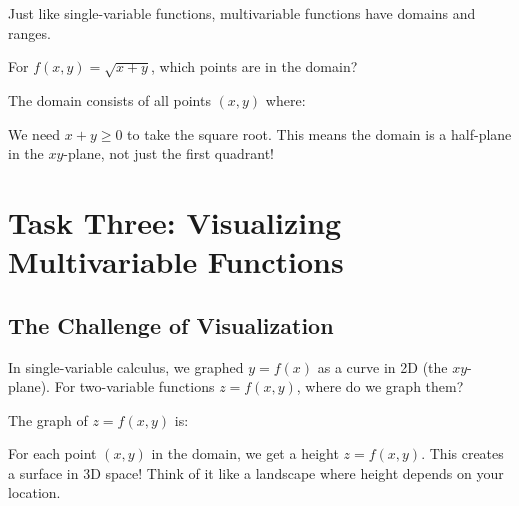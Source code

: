 \documentclass{ximera}
\begin{document}
\begin{problem}
Just like single-variable functions, multivariable functions have domains and ranges.

For $f(x, y) = \sqrt{x + y}$, which points are in the domain?

\begin{selectAll}
\end{selectAll}

The domain consists of all points $(x, y)$ where:
\begin{multipleChoice}
\end{multipleChoice}

\begin{feedback}
We need $x + y \geq 0$ to take the square root. This means the domain is a half-plane in the $xy$-plane, not just the first quadrant!
\end{feedback}
\end{problem}

\section*{Task Three: Visualizing Multivariable Functions}

\subsection*{The Challenge of Visualization}

\begin{problem}
In single-variable calculus, we graphed $y = f(x)$ as a curve in 2D (the $xy$-plane). For two-variable functions $z = f(x,y)$, where do we graph them?

\begin{multipleChoice}
\end{multipleChoice}

The graph of $z = f(x, y)$ is:
\begin{multipleChoice}
\end{multipleChoice}

\begin{feedback}
For each point $(x, y)$ in the domain, we get a height $z = f(x, y)$. This creates a surface in 3D space! Think of it like a landscape where height depends on your location.
\end{feedback}
\end{problem}
\end{document}
